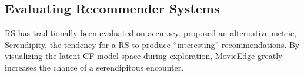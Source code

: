 \subsection{Evaluating Recommender Systems}

RS has traditionally been evaluated on accuracy. \cite{herlocker2004evaluating} proposed an alternative metric, Serendipity, the tendency for a RS to produce  “interesting” recommendations. By visualizing the latent CF model space during exploration, MovieEdge greatly increases the chance of a serendipitous encounter.
